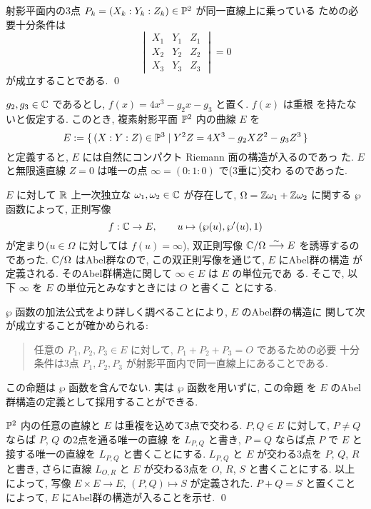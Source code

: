 \documentclass[12pt,twoside]{jarticle}
\def\pe{\wp}
\def\Z{{\Bbb Z}} %
\def\R{{\Bbb R}} %
\def\C{{\Bbb C}} %
\def\P{{\Bbb P}}
\def\isoto{\overset\sim\longrightarrow}
\begin{document}
\begin{question}
  射影平面内の3点 $P_k=(X_k:Y_k:Z_k)\in\P^2$ が同一直線上に乗っている
  ための必要十分条件は
  \[
  \begin{vmatrix}
    X_1 & Y_1 & Z_1 \\
    X_2 & Y_2 & Z_2 \\
    X_3 & Y_3 & Z_3
  \end{vmatrix}
  = 0
  \] %
  が成立することである. \qed
\end{question}

$g_2,g_3\in\C$ であるとし, $f(x)=4x^3-g_2x-g_3$ と置く. $f(x)$ は重根
を持たないと仮定する. このとき, 複素射影平面 $\P^2$ 内の曲線 $E$ を
\[
  E :=
  \{\, (X:Y:Z)\in\P^3
  \mid Y^2Z = 4X^3 - g_2 XZ^2 - g_3 Z^3 \,\}
\] %
と定義すると, $E$ には自然にコンパクト Riemann 面の構造が入るのであっ
た. $E$ と無限遠直線 $Z=0$ は唯一の点 $\infty=(0:1:0)$ で(3重に)交わ
るのであった.

$E$ に対して $\R$ 上一次独立な $\omega_1,\omega_2\in\C$ が存在して, %
$\Omega=\Z\omega_1+\Z\omega_2$ に関する $\pe$ 函数によって, 正則写像
\[
  f : \C \to E,
  \qquad
  u \mapsto (\pe(u),\pe'(u),1)
\]
が定まり($u\in\Omega$ に対しては $f(u)=\infty$), %
双正則写像 $\C/\Omega \isoto E$ を誘導するのであった. %
$\C/\Omega$ はAbel群なので, この双正則写像を通じて, $E$ にAbel群の構造
が定義される. そのAbel群構造に関して $\infty\in E$ は $E$ の単位元であ
る. そこで, 以下 $\infty$ を $E$ の単位元とみなすときには $O$ と書くこ
とにする.

$\pe$ 函数の加法公式をより詳しく調べることにより, $E$ のAbel群の構造に
関して次が成立することが確かめられる:
\begin{quote}
  任意の $P_1,P_2,P_3\in E$ に対して, $P_1+P_2+P_3=O$ であるための必要
  十分条件は3点 $P_1,P_2,P_3$ が射影平面内で同一直線上にあることである.
\end{quote}
この命題は $\pe$ 函数を含んでない. 実は $\pe$ 函数を用いずに, この命題
を $E$ のAbel群構造の定義として採用することができる.

\begin{question}
  $\P^2$ 内の任意の直線と $E$ は重複を込めて3点で交わる. %
  $P,Q\in E$ に対して, $P\ne Q$ ならば $P$, $Q$ の2点を通る唯一の直線
  を $L_{P,Q}$ と書き, $P=Q$ ならば点 $P$ で $E$ と接する唯一の直線を 
  $L_{P,Q}$ と書くことにする. %
  $L_{P,Q}$ と $E$ が交わる3点を $P$, $Q$, $R$ と書き, さらに直線 %
  $L_{O,R}$ と $E$ が交わる3点を $O$, $R$, $S$ と書くことにする. 以上
  によって, 写像 $E\times E\to E$, $(P,Q)\mapsto S$ が定義された. %
  $P+Q=S$ と置くことによって, $E$ にAbel群の構造が入ることを示せ. \qed
\end{question}
\end{document}
